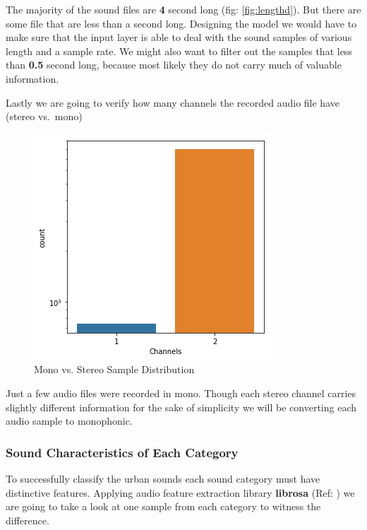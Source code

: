 The majority of the sound files are \textbf{4} second long (fig:
\ref{fig:lengthd}). But there are some file that are less than a second
long. Designing the model we would have to make sure that the input
layer is able to deal with the sound samples of various length and a
sample rate. We might also want to filter out the samples that less than
\textbf{0.5} second long, because most likely they do not carry much of
valuable information.

Lastly we are going to verify how many channels the recorded audio file
have (stereo vs.~mono)

\begin{Schunk}
\begin{figure}[H]

{\centering \includegraphics[width=0.5\linewidth]{../images/audio_channels} 

}

\caption[Mono vs]{Mono vs. Stereo Sample Distribution}\label{fig:channeld}
\end{figure}
\end{Schunk}

Just a few audio files were recorded in mono. Though each stereo channel
carries slightly different information for the sake of simplicity we
will be converting each audio sample to monophonic.

\hypertarget{sound-characteristics-of-each-category}{%
\subsubsection{Sound Characteristics of Each
Category}\label{sound-characteristics-of-each-category}}

To successfully classify the urban sounds each sound category must have
distinctive features. Applying audio feature extraction library
\textbf{librosa} (Ref: \cite{librosa}) we are going to take a look at
one sample from each category to witness the difference.


